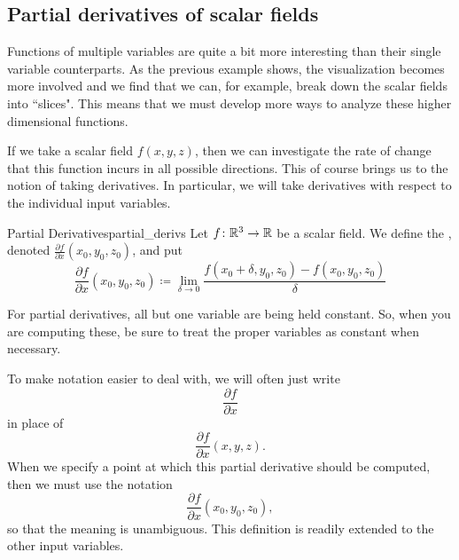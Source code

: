                 \subsection{Partial derivatives of scalar fields}
                       Functions of multiple variables are quite a bit more interesting than their single variable counterparts. As the previous example shows, the visualization becomes more involved and we find that we can, for example, break down the scalar fields into ``slices". This means that we must develop more ways to analyze these higher dimensional functions. 

                        If we take a scalar field $f(x,y,z)$, then we can investigate the rate of change that this function incurs in all possible directions. This of course brings us to the notion of taking derivatives. In particular, we will take derivatives with respect to the individual input variables.
                        
                        \begin{df}{Partial Derivatives}{partial_derivs}
                        Let $f\colon \mathbb{R}^3 \to \mathbb{R}$ be a scalar field.  We define the  , denoted $\frac{\partial f}{\partial x}(x_0,y_0,z_0)$, and put
                        \[
                        \frac{\partial f}{\partial x}(x_0,y_0,z_0)\coloneqq \lim_{\delta \to 0} \frac{f(x_0+\delta,y_0,z_0)-f(x_0,y_0,z_0)}{\delta}
                        \]
                        \end{df}                        
                        
                        \begin{remark}
                        For partial derivatives, all but one variable are being held constant.  So, when you are computing these, be sure to treat the proper variables as constant when necessary.
                        \end{remark}
                        
                        To make notation easier to deal with, we will often just write 
                        \[
                        \frac{\partial f}{\partial x}
                        \]
                        in place of
                        \[
                        \frac{\partial f}{\partial x}(x,y,z).
                        \]
                        When we specify a point at which this partial derivative should be computed, then we must use the notation
                        \[
                         \frac{\partial f}{\partial x}(x_0,y_0,z_0),
                        \]
                        so that the meaning is unambiguous. This definition is readily extended to the other input variables.
                        
